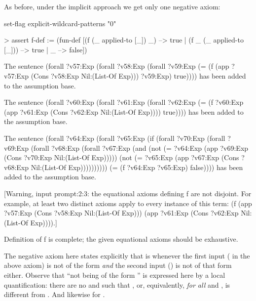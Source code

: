 As before, under the implicit approach we get only one negative
axiom: 
\begin{tcAthena}
set-flag explicit-wildcard-patterns "0" 

> assert f-def :=
    (fun-def [(f (_ applied-to [_]) _) --> true
            | (f _ (_ applied-to [_])) --> true
            | _ --> false])

The sentence 
(forall ?v57:Exp
  (forall ?v58:Exp
    (forall ?v59:Exp
      (= (f (app ?v57:Exp
                 (Cons ?v58:Exp
                       Nil:(List-Of Exp)))
            ?v59:Exp)
         true))))
has been added to the assumption base.

The sentence 
(forall ?v60:Exp
  (forall ?v61:Exp
    (forall ?v62:Exp
      (= (f ?v60:Exp
            (app ?v61:Exp
                 (Cons ?v62:Exp
                       Nil:(List-Of Exp))))
         true))))
has been added to the assumption base.

The sentence 
(forall ?v64:Exp
  (forall ?v65:Exp
    (if (forall ?v70:Exp
          (forall ?v69:Exp
            (forall ?v68:Exp
              (forall ?v67:Exp
                (and (not (= ?v64:Exp
                             (app ?v69:Exp
                                  (Cons ?v70:Exp
                                        Nil:(List-Of Exp)))))
                     (not (= ?v65:Exp
                             (app ?v67:Exp
                                  (Cons ?v68:Exp
                                        Nil:(List-Of Exp))))))))))
        (= (f ?v64:Exp ?v65:Exp)
           false))))
has been added to the assumption base.

[Warning, input prompt:2:3: the equational axioms defining f are not disjoint.
For example, at least two distinct axioms apply to every instance of this term:
(f (app ?v57:Exp (Cons ?v58:Exp Nil:(List-Of Exp))) 
   (app ?v61:Exp (Cons ?v62:Exp Nil:(List-Of Exp)))).]

Definition of f is complete; the given equational axioms should be exhaustive.
\end{tcAthena}
The negative axiom here states explicitly that 
 is  whenever the first 
input ( in the above axiom) is not of the form 
{\em and\/} the second input () is not of that form either.
Observe that ``not being of the form '' is 
expressed here by a local quantification: there are no  and 
such that , or, equivalently,
{\em for all\/}  and ,  is different from 
. And likewise for . 


